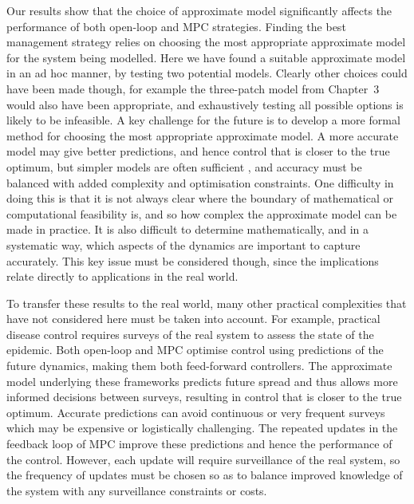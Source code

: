 Our results show that the choice of approximate model significantly affects the performance of both open-loop and MPC strategies. Finding the best management strategy relies on choosing the most appropriate approximate model for the system being modelled. Here we have found a suitable approximate model in an ad hoc manner, by testing two potential models. Clearly other choices could have been made though, for example the three-patch model from Chapter~3 would also have been appropriate, and exhaustively testing all possible options is likely to be infeasible. A key challenge for the future is to develop a more formal method for choosing the most appropriate approximate model. A more accurate model may give better predictions, and hence control that is closer to the true optimum, but simpler models are often sufficient \citep{thompson_effect_2018}, and accuracy must be balanced with added complexity and optimisation constraints. One difficulty in doing this is that it is not always clear where the boundary of mathematical or computational feasibility is, and so how complex the approximate model can be made in practice. It is also difficult to determine mathematically, and in a systematic way, which aspects of the dynamics are important to capture accurately. This key issue must be considered though, since the implications relate directly to applications in the real world. 

To transfer these results to the real world, many other practical complexities that have not considered here must be taken into account. For example, practical disease control requires surveys of the real system to assess the state of the epidemic. Both open-loop and MPC optimise control using predictions of the future dynamics, making them both feed-forward controllers. The approximate model underlying these frameworks predicts future spread and thus allows more informed decisions between surveys, resulting in control that is closer to the true optimum. Accurate predictions can avoid continuous or very frequent surveys which may be expensive or logistically challenging. The repeated updates in the feedback loop of MPC improve these predictions and hence the performance of the control. However, each update will require surveillance of the real system, so the frequency of updates must be chosen so as to balance improved knowledge of the system with any surveillance constraints or costs.

